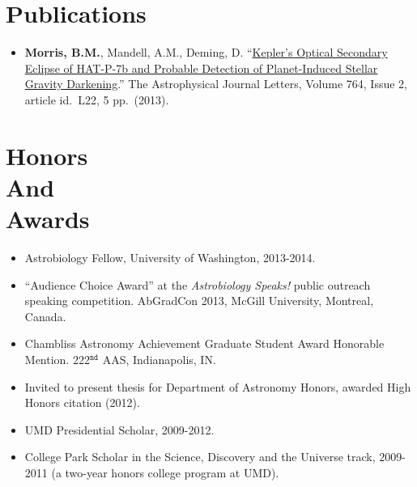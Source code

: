 \documentclass[margin]{res}
\begin{document}
\begin{resume}

\section{Publications}
\begin{itemize}   
\item \textbf{Morris, B.M.}, Mandell, A.M., Deming, D. ``\href{http://adsabs.harvard.edu/abs/2013ApJ...764L..22M}{Kepler's Optical Secondary Eclipse of HAT-P-7b and Probable Detection of Planet-Induced Stellar Gravity Darkening}.'' The Astrophysical Journal Letters, Volume 764, Issue 2, article id.\ L22, 5 pp.\ (2013).\\
\end{itemize}


\section{Honors\\And\\Awards} 
\begin{itemize}   
\item Astrobiology Fellow, University of Washington, 2013-2014.

\item ``Audience Choice Award'' at the \textit{Astrobiology Speaks!} public outreach speaking competition. AbGradCon 2013, McGill University, Montreal, Canada. 

\item Chambliss Astronomy Achievement Graduate Student Award Honorable Mention. 222$^{\mathtt{nd}}$ AAS, Indianapolis, IN.

\item Invited to present thesis for Department of Astronomy Honors, awarded High Honors citation (2012).

\item UMD Presidential Scholar, 2009-2012.

\item College Park Scholar in the Science, Discovery and the Universe track, 2009-2011 (a two-year honors college program at UMD). \\
\end{itemize}
                 

\end{resume}
\end{document}
